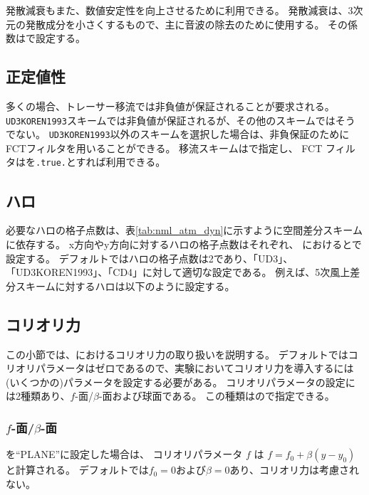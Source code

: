 発散減衰もまた、数値安定性を向上させるために利用できる。
発散減衰は、3次元の発散成分を小さくするもので、主に音波の除去のために使用する。
その係数はで設定する。

\subsection{正定値性}

多くの場合、トレーサー移流では非負値が保証されることが要求される。
\verb|UD3KOREN1993|スキームでは非負値が保証されるが、その他のスキームではそうでない。
\verb|UD3KOREN1993|以外のスキームを選択した場合は、非負保証のためにFCTフィルタを用いることができる。
移流スキームはで指定し、
FCT フィルタはを\verb|.true.|とすれば利用できる。

\subsection{ハロ}

必要なハロの格子点数は、表\ref{tab:nml_atm_dyn}に示すように空間差分スキームに依存する。
x方向やy方向に対するハロの格子点数はそれぞれ、
におけるとで設定する。
デフォルトではハロの格子点数は2であり、「UD3」、「UD3KOREN1993」、「CD4」に対して適切な設定である。
例えば、5次風上差分スキームに対するハロは以下のように設定する。


\subsection{コリオリ力} \label{subsec:coriolis}

この小節では、{\scalerm}におけるコリオリ力の取り扱いを説明する。
デフォルトではコリオリパラメータはゼロであるので、実験においてコリオリ力を導入するには
(いくつかの)パラメータを設定する必要がある。
コリオリパラメータの設定には2種類あり、$f$-面/$\beta$-面および球面である。
この種類はので指定できる。

\subsubsection{$f$-面/$\beta$-面}
を``PLANE''に設定した場合は、
コリオリパラメータ $f$ は $f=f_0 + \beta (y-y_0)$と計算される。
デフォルトでは$f_0=0$および$\beta=0$あり、コリオリ力は考慮されない。

